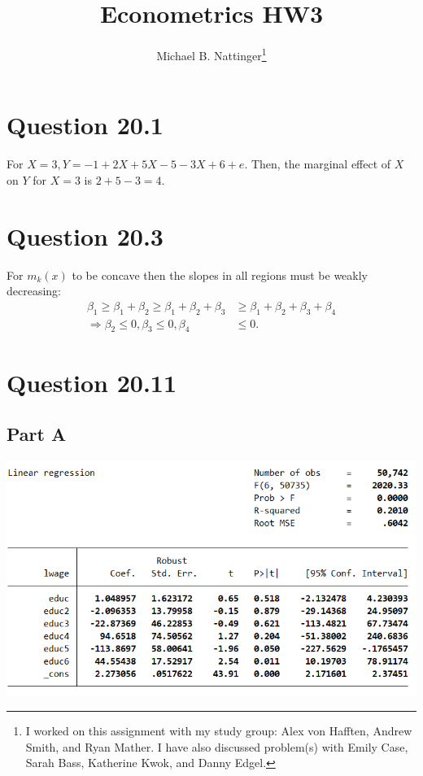 \documentclass[11pt]{article} %
\title{Econometrics HW3}
\author{Michael B. Nattinger\footnote{I worked on this assignment with my study group: Alex von Hafften, Andrew Smith, and Ryan Mather. I have also discussed problem(s) with Emily Case, Sarah Bass, Katherine Kwok, and Danny Edgel.}}
\begin{document}
\maketitle

\section{Question 20.1}
For $X=3, Y = -1 +2X + 5X-5-3X+6+e$. Then, the marginal effect of $X$ on $Y$ for $X=3$ is $2+5-3 = 4$.
\section{Question 20.3}
For $m_k(x)$ to be concave then the slopes in all regions must be weakly decreasing:
\begin{align*}
\beta_1\geq \beta_1+\beta_2\geq \beta_1+\beta_2+\beta_3&\geq\beta_1+\beta_2+\beta_3+\beta_4\\
\Rightarrow \beta_2\leq0,\beta_3\leq0,\beta_4&\leq0.
\end{align*}
\section{Question 20.11} %
\subsection{Part A}
\includegraphics{p1}
\end{document}

